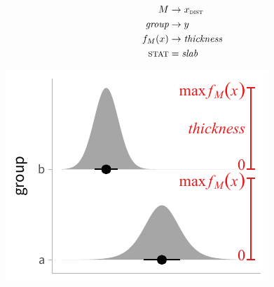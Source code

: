 \documentclass[journal]{vgtc}                     %
\newcommand{\equationfigure}[2]{%
\noindent
\begin{minipage}{.5\columnwidth}
\setlength{\abovedisplayskip}{0pt} %
\setlength{\belowdisplayskip}{0pt} %
#1\end{minipage}%
\begin{minipage}{.4\columnwidth}\centering #2 \end{minipage}%
\vspace{.5\belowdisplayskip}\\
}
\begin{document}
\equationfigure{
\begin{align*}
M &\rightarrow x_\textsc{dist}\\
\textit{group} &\rightarrow y\\
f_M(x) &\rightarrow \textit{thickness}\\
\textsc{stat} &= \mathit{slab}
\end{align*}
}{\includegraphics[width=1.2\columnwidth]{figs/3-slab_density_two_groups.pdf}}
\end{document}
